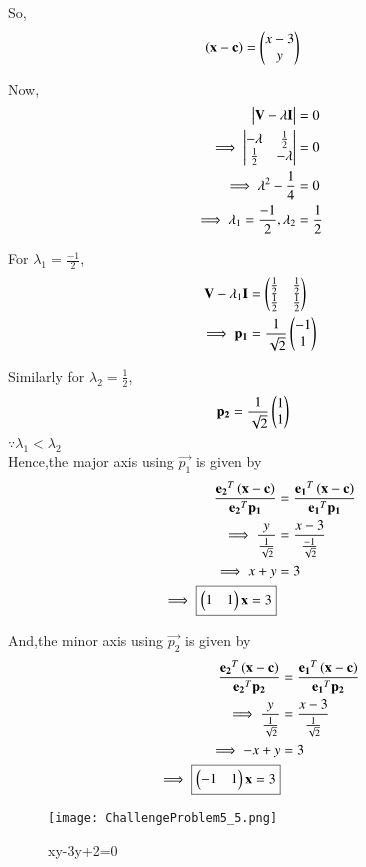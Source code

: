\documentclass[journal,12pt,twocolumn]{IEEEtran}
\begin{document}
\begin{enumerate}
    So,
    \begin{align}
    \left(\mathbf{x}-\mathbf{c}\right) &= \begin{pmatrix}x-3 \\ y\end{pmatrix}
    \end{align}

    Now,
    \begin{align}
        \begin{vmatrix}\mathbf{V}-\lambda\mathbf{I}\end{vmatrix} &= 0 \\
        \implies \begin{vmatrix}-\lambda & \frac{1}{2} \\ \frac{1}{2} & -\lambda\end{vmatrix} &= 0 \\
        \implies \lambda^2-\frac{1}{4} &= 0 \\
        \implies \lambda_1 =\frac{-1}{2},\lambda_2 &= \frac{1}{2}
    \end{align}
    
    For $\lambda_1=\frac{-1}{2}$,
    \begin{align}
        \mathbf{V}-\lambda_1\mathbf{I} &= \begin{pmatrix}\frac{1}{2} & \frac{1}{2} \\ \frac{1}{2} & \frac{1}{2}\end{pmatrix} \\
        \implies \mathbf{p_1} &= \frac{1}{\sqrt{2}}\begin{pmatrix}-1 \\ 1\end{pmatrix}
    \end{align}
    
    Similarly for $\lambda_2=\frac{1}{2}$,
    \begin{align}
        \mathbf{p_2} &= \frac{1}{\sqrt{2}}\begin{pmatrix}1 \\ 1\end{pmatrix}
    \end{align}
    $\because \lambda_1<\lambda_2$ \\
    Hence,the major axis using $\vec{p_1}$ is given by
    \begin{align}
        \frac{\mathbf{e_2}^T\left(\mathbf{x}-\mathbf{c}\right)}{{\mathbf{e_2}^T\mathbf{p_1}}} &= \frac{\mathbf{e_1}^T\left(\mathbf{x}-\mathbf{c}\right)}{{\mathbf{e_1}^T\mathbf{p_1}}}\\
        \implies \frac{y}{\frac{1}{\sqrt{2}}} &= \frac{x-3}{\frac{-1}{\sqrt{2}}} \\
        \implies x+y &= 3\\
        \implies \boxed{\begin{pmatrix}1 & 1\end{pmatrix}\mathbf{x} = 3}
    \end{align}
    
    And,the minor axis using $\vec{p_2}$ is given by
    \begin{align}
        \frac{\mathbf{e_2}^T\left(\mathbf{x}-\mathbf{c}\right)}{{\mathbf{e_2}^T\mathbf{p_2}}} &= \frac{\mathbf{e_1}^T\left(\mathbf{x}-\mathbf{c}\right)}{{\mathbf{e_1}^T\mathbf{p_2}}}\\
        \implies \frac{y}{\frac{1}{\sqrt{2}}} &= \frac{x-3}{\frac{1}{\sqrt{2}}} \\
        \implies -x+y &= 3 \\
        \implies \boxed{\begin{pmatrix}-1 & 1\end{pmatrix}\mathbf{x} = 3}
    \end{align}
   
    \begin{figure}[!ht]
    \centering
    \texttt{[image: ChallengeProblem5\_5.png]}
    \caption{xy-3y+2=0}
    \label{ex5}	
    \end{figure}
    
\end{enumerate}
\end{document}
